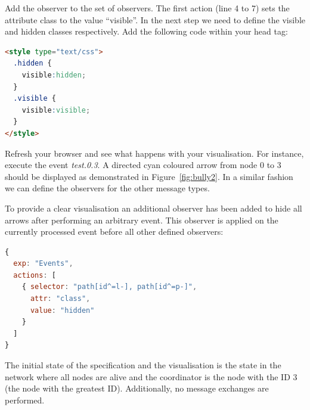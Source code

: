 Add the observer to the set of observers.
The first action (line 4 to 7) sets the attribute class to the value ``visible''.
In the next step we need to define the visible and hidden classes respectively.
Add the following code within your head tag:

\begin{lstlisting}[language=html]
<style type="text/css">
  .hidden {
    visible:hidden;
  }
  .visible {
    visible:visible;
  }
</style>
\end{lstlisting}

Refresh your browser and see what happens with your visualisation.
For instance, execute the event \textit{test.0.3}.
A directed cyan coloured arrow from node 0 to 3 should be displayed as demonstrated in Figure~\ref{fig:bully2}.
In a similar fashion we can define the observers for the other message types. 

To provide a clear visualisation an additional observer has been added to hide all arrows after performing an arbitrary event.
This observer is applied on the currently processed event before all other defined observers:

\begin{lstlisting}[language=JavaScript]
{
  exp: "Events",
  actions: [
    { selector: "path[id^=l-], path[id^=p-]", 
      attr: "class", 
      value: "hidden"
    }
  ]
}
\end{lstlisting}
 
The initial state of the specification and the visualisation is the state in the network where all nodes are alive and the coordinator is the node with the ID 3 (the node with the greatest ID). 
Additionally, no message exchanges are performed.